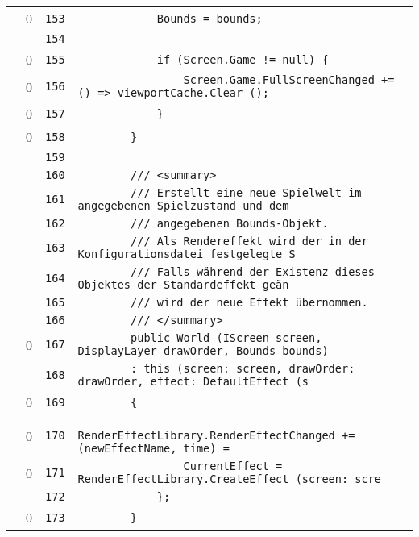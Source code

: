 \documentclass[a4paper,10pt]{article}
\begin{document}
\begin{longtable}[l]{lrrl}
\cellcolor{red} & 0 & \verb~153~ & \verb~            Bounds = bounds;~\\
\cellcolor{gray} &  & \verb~154~ & \verb~~\\
\cellcolor{red} & 0 & \verb~155~ & \verb~            if (Screen.Game != null) {~\\
\cellcolor{red} & 0 & \verb~156~ & \verb~                Screen.Game.FullScreenChanged += () => viewportCache.Clear ();~\\
\cellcolor{red} & 0 & \verb~157~ & \verb~            }~\\
\cellcolor{red} & 0 & \verb~158~ & \verb~        }~\\
\cellcolor{gray} &  & \verb~159~ & \verb~~\\
\cellcolor{gray} &  & \verb~160~ & \verb~        /// <summary>~\\
\cellcolor{gray} &  & \verb~161~ & \verb~        /// Erstellt eine neue Spielwelt im angegebenen Spielzustand und dem~\\
\cellcolor{gray} &  & \verb~162~ & \verb~        /// angegebenen Bounds-Objekt.~\\
\cellcolor{gray} &  & \verb~163~ & \verb~        /// Als Rendereffekt wird der in der Konfigurationsdatei festgelegte S~\\
\cellcolor{gray} &  & \verb~164~ & \verb~        /// Falls während der Existenz dieses Objektes der Standardeffekt geän~\\
\cellcolor{gray} &  & \verb~165~ & \verb~        /// wird der neue Effekt übernommen.~\\
\cellcolor{gray} &  & \verb~166~ & \verb~        /// </summary>~\\
\cellcolor{red} & 0 & \verb~167~ & \verb~        public World (IScreen screen, DisplayLayer drawOrder, Bounds bounds)~\\
\cellcolor{gray} &  & \verb~168~ & \verb~        : this (screen: screen, drawOrder: drawOrder, effect: DefaultEffect (s~\\
\cellcolor{red} & 0 & \verb~169~ & \verb~        {~\\
\cellcolor{red} & 0 & \verb~170~ & \verb~            RenderEffectLibrary.RenderEffectChanged += (newEffectName, time) =~\\
\cellcolor{red} & 0 & \verb~171~ & \verb~                CurrentEffect = RenderEffectLibrary.CreateEffect (screen: scre~\\
\cellcolor{gray} &  & \verb~172~ & \verb~            };~\\
\cellcolor{red} & 0 & \verb~173~ & \verb~        }~\\

\end{longtable}
\end{document}
